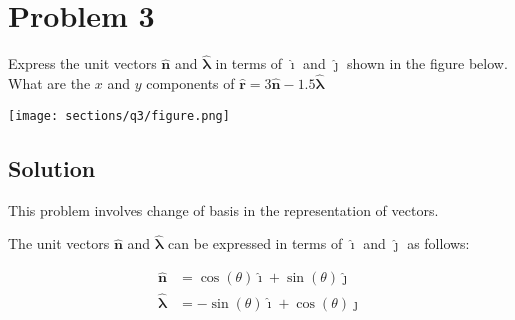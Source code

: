 \section*{Problem 3}

Express the unit vectors \( \mathbf{\hat{n}} \) and \( \mathbf{\hat{\lambda}} \) in terms of \( \mathbf{\hat{\imath}} \) and \( \mathbf{\hat{\jmath}} \) shown in the figure below.
What are the \( x \) and \( y \) components of \( \mathbf{\hat{r}} = 3\mathbf{\hat{n}} - 1.5\mathbf{\hat{\lambda}} \)

\begin{figure*}[h]
    \centering
    \texttt{[image: sections/q3/figure.png]}
\end{figure*}

\subsection*{Solution}

This problem involves change of basis in the representation of vectors.

The unit vectors \( \mathbf{\hat{n}} \) and \( \mathbf{\hat{\lambda}} \) can be expressed in terms of \( \mathbf{\hat{\imath}} \) and \( \mathbf{\hat{\jmath}} \) as follows:

\[
    \begin{aligned}
        \mathbf{\hat{n}}       & = \cos(\theta) \mathbf{\hat{\imath}}  + \sin(\theta) \mathbf{\hat{\jmath}} \\
        \mathbf{\hat{\lambda}} & = -\sin(\theta) \mathbf{\hat{\imath}} + \cos(\theta) \mathbf{\hat{\jmath}}
    \end{aligned}
\]
